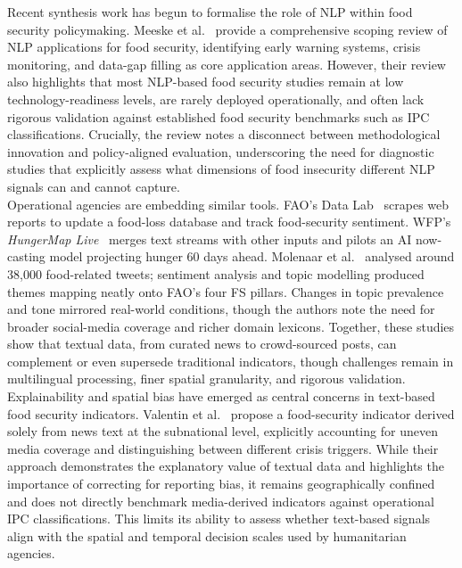 \documentclass{article}
\begin{document}
Recent synthesis work has begun to formalise the role of NLP within food security policymaking. Meeske et al.~\citep{Meeske2025} provide a comprehensive scoping review of NLP applications for food security, identifying early warning systems, crisis monitoring, and data-gap filling as core application areas. However, their review also highlights that most NLP-based food security studies remain at low technology-readiness levels, are rarely deployed operationally, and often lack rigorous validation against established food security benchmarks such as IPC classifications. Crucially, the review notes a disconnect between methodological innovation and policy-aligned evaluation, underscoring the need for diagnostic studies that explicitly assess what dimensions of food insecurity different NLP signals can and cannot capture.\\

Operational agencies are embedding similar tools. FAO's Data Lab~\citep{FAODataLab2024} scrapes web reports to update a food-loss database and track food-security sentiment. WFP's \textit{HungerMap Live}~\citep{WFPhm2024} merges text streams with other inputs and pilots an AI now-casting model projecting hunger 60 days ahead. Molenaar et al.~\citep{Molenaar2024} analysed around 38{,}000 food-related tweets; sentiment analysis and topic modelling produced themes mapping neatly onto FAO’s four FS pillars. Changes in topic prevalence and tone mirrored real-world conditions, though the authors note the need for broader social-media coverage and richer domain lexicons. Together, these studies show that textual data, from curated news to crowd-sourced posts, can complement or even supersede traditional indicators, though challenges remain in multilingual processing, finer spatial granularity, and rigorous validation.\\

Explainability and spatial bias have emerged as central concerns in text-based food security indicators. Valentin et al.~\citep{Valentin2024} propose a food-security indicator derived solely from news text at the subnational level, explicitly accounting for uneven media coverage and distinguishing between different crisis triggers. While their approach demonstrates the explanatory value of textual data and highlights the importance of correcting for reporting bias, it remains geographically confined and does not directly benchmark media-derived indicators against operational IPC classifications. This limits its ability to assess whether text-based signals align with the spatial and temporal decision scales used by humanitarian agencies.\\
\end{document}
